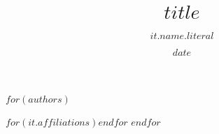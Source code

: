 \title{$title$}
$for(authors)$
\author[$for(it.affiliations)$$it.number$$endfor$]{$it.name.literal$}
$for(it.affiliations)$$endfor$
$endfor$
\date{$date$}
